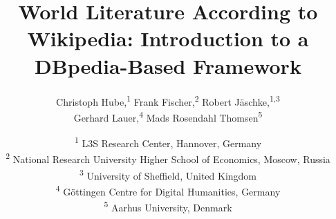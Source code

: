 \documentclass[a4paper,12pt]{scrartcl}
\begin{document}

\begin{comment}
\vspace*{0.35in}

\begin{flushleft}
{\Large
\textbf\newline{World Literature According to Wikipedia: Introduction to a DBpedia-Based Framework}
}
\newline
\\
Christoph Hube,\textsuperscript{1}
Frank Fischer,\textsuperscript{2}
Robert Jäschke,\textsuperscript{1,*}
Gerhard Lauer,\textsuperscript{3}
Mads Rosendahl Thomsen\textsuperscript{4}
\\
\bigskip
\bf{1} L3S Research Center, Hannover, Germany
\\
\bf{2} National Research University Higher School of Economics, Moscow, Russia
\\
\bf{3} Göttingen Centre for Digital Humanities, Germany
\\
\bf{4} Aarhus University, Denmark
\\
\bigskip

* jaeschke@L3S.de

\end{flushleft}
\section*{Abstract}
\end{comment}

\title{World Literature According to Wikipedia: Introduction to a DBpedia-Based Framework}
\author{
Christoph Hube,\textsuperscript{1}
Frank Fischer,\textsuperscript{2}
Robert Jäschke,\textsuperscript{1,3}\\
Gerhard Lauer,\textsuperscript{4}
Mads Rosendahl Thomsen\textsuperscript{5}}
\date{\small
\textsuperscript{1} L3S Research Center, Hannover, Germany\\
\textsuperscript{2} National Research University Higher School of Economics, Moscow, Russia\\
\textsuperscript{3} University of Sheffield, United Kingdom\\
\textsuperscript{4} Göttingen Centre for Digital Humanities, Germany\\
\textsuperscript{5} Aarhus University, Denmark
}
\maketitle
\end{document}
